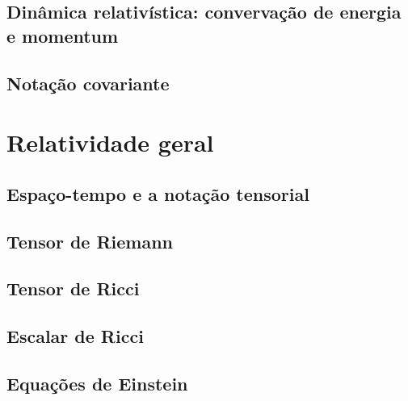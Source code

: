 \documentclass[12pt,a4paper,titlepage,brazil]{article}
\begin{document}

\subsection{Dinâmica relativística: convervação de energia e momentum}


\subsection{Notação covariante}


\section{Relatividade geral}


\subsection{Espaço-tempo e a notação tensorial}


\subsection{Tensor de Riemann}


\subsection{Tensor de Ricci}


\subsection{Escalar de Ricci}


\subsection{Equações de Einstein}
\end{document}
